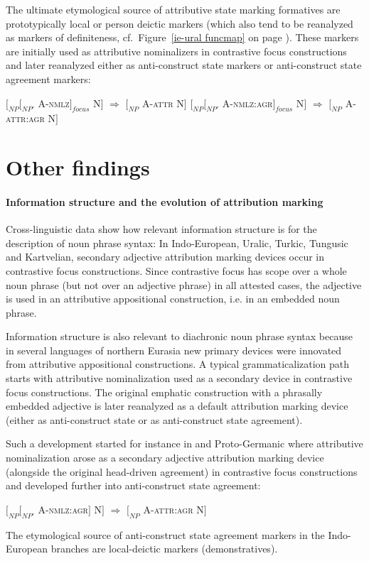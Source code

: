 The ultimate etymological source of attributive state marking formatives are prototypically local or person deictic markers (which also tend to be reanalyzed as markers of definiteness, cf.~Figure~\ref{ie-ural funcmap} on page \pageref{ie-ural funcmap}). These markers are initially used as attributive nominalizers in contrastive focus constructions and later reanalyzed either as anti-construct state markers or anti-construct state agreement markers:
\begin{exe}
\ex
\begin{xlist}
\ex \rm{$[_{NP} [_{NP'}$ A-\textsc{nmlz}$]_{focus}$ N$]$ $\Rightarrow$ $[_{NP}$ A-\textsc{attr} N$]$}
\ex \rm{$[_{NP} [_{NP'}$ A-\textsc{nmlz:agr}$]_{focus}$ N$]$ $\Rightarrow$ $[_{NP}$ A-\textsc{attr:agr} N$]$}
\end{xlist}
\end{exe}

\section{Other findings}
\paragraph{Information structure and the evolution of attribution marking} Cross-linguistic data show how relevant information structure is for the description of noun phrase syntax: In Indo-European, Uralic, Turkic, Tungusic and Kartvelian, secondary adjective attribution marking devices occur in contrastive focus constructions. Since contrastive focus has scope over a whole noun phrase (but not over an adjective phrase) in all attested cases, the adjective is used in an attributive appositional construction, i.e. in an embedded noun phrase.

Information structure is also relevant to diachronic noun phrase syntax because in several languages of northern Eurasia new primary devices were innovated from attributive appositional constructions. A typical grammaticalization path starts with attributive nominalization used as a secondary device in contrastive focus constructions. The original emphatic construction with a phrasally embedded adjective is later reanalyzed as a default attribution marking device (either as anti-construct state or as anti-construct state agreement).

Such a development started for instance in  and Proto\hyp{}Germanic where attributive nominalization arose as a secondary adjective attribution marking device (alongside the original head\hyp{}driven agreement) in contrastive focus constructions and developed further into anti-construct state agreement:
\begin{exe}
\ex \rm{$[_{NP} [_{NP'}$ A-\textsc{nmlz:agr}$]$ N$]$ $\Rightarrow$ $[_{NP}$ A-\textsc{attr:agr} N$]$}
\end{exe}
The etymological source of anti-construct state agreement markers in the Indo-European branches are local-deictic markers (demonstratives).

